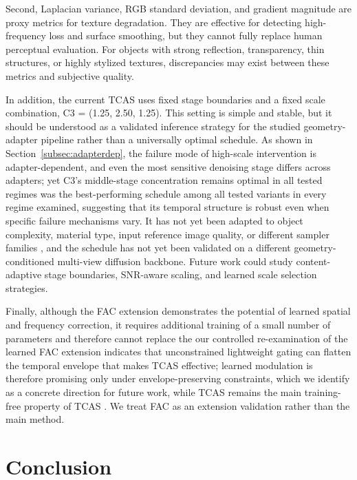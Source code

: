 \documentclass[times,twocolumn,final]{elsarticle}
\providecommand{\DIFadd}[1]{{\protect\color{blue} \sf #1}} %
\providecommand{\DIFdel}[1]{{\protect\color{red} \scriptsize #1}} %
\providecommand{\DIFaddbegin}{} %
\providecommand{\DIFaddend}{} %
\providecommand{\DIFdelbegin}{} %
\providecommand{\DIFdelend}{} %
\newcommand{\DIFscaledelfig}{0.5}
\newlength{\DIFdelgraphicswidth} %
\newlength{\DIFdelgraphicsheight} %
\newcommand{\DIFaddincludegraphics}[2][]{{\color{blue}\fbox{\DIFOincludegraphics[#1]{#2}}}} %
\newcommand{\DIFdelincludegraphics}[2][]{%
\sbox{\DIFdelgraphicsbox}{\DIFOincludegraphics[#1]{#2}}%
\settoboxwidth{\DIFdelgraphicswidth}{\DIFdelgraphicsbox} %
\settoboxtotalheight{\DIFdelgraphicsheight}{\DIFdelgraphicsbox} %
\scalebox{\DIFscaledelfig}{%
\parbox[b]{\DIFdelgraphicswidth}{\usebox{\DIFdelgraphicsbox}\\[-\baselineskip] \rule{\DIFdelgraphicswidth}{0em}}\llap{\resizebox{\DIFdelgraphicswidth}{\DIFdelgraphicsheight}{%
\setlength{\unitlength}{\DIFdelgraphicswidth}%
\begin{picture}(1,1)%
\thicklines\linethickness{2pt} %
{\color[rgb]{1,0,0}\put(0,0){\framebox(1,1){}}}%
{\color[rgb]{1,0,0}\put(0,0){\line( 1,1){1}}}%
{\color[rgb]{1,0,0}\put(0,1){\line(1,-1){1}}}%
\end{picture}%
}\hspace*{3pt}}} %
} %
\DeclareRobustCommand{\DIFaddbegin}{\DIFOaddbegin \let\includegraphics\DIFaddincludegraphics} %
\DeclareRobustCommand{\DIFaddend}{\DIFOaddend \let\includegraphics\DIFOincludegraphics} %
\DeclareRobustCommand{\DIFdelbegin}{\DIFOdelbegin \let\includegraphics\DIFdelincludegraphics} %
\DeclareRobustCommand{\DIFdelend}{\DIFOaddend \let\includegraphics\DIFOincludegraphics} %
\begin{document}
Second, Laplacian variance, RGB standard deviation, and gradient magnitude are proxy metrics for texture degradation. They are effective for detecting high-frequency loss and surface smoothing, but they cannot fully replace human perceptual evaluation. For objects with strong reflection, transparency, thin structures, or highly stylized textures, discrepancies may exist between these metrics and subjective quality.

In addition, the current TCAS uses fixed stage boundaries and a fixed scale combination, C3 = (1.25, 2.50, 1.25). This setting is simple and stable, but it should be understood as a validated inference strategy for the studied geometry-adapter pipeline rather than a universally optimal schedule. As shown in Section~\ref{subsec:adapterdep}, the failure mode of high-scale intervention is adapter-dependent, and even the most sensitive denoising stage differs across adapters; yet C3's middle-stage concentration \DIFdelbegin \DIFdel{remains optimal in all tested regimes}\DIFdelend \DIFaddbegin \DIFadd{was the best-performing schedule among all tested variants in every regime examined}\DIFaddend , suggesting that its temporal structure is robust even when specific failure mechanisms vary. It has not yet been adapted to object complexity, material type, input reference image quality, or different sampler families\DIFaddbegin \DIFadd{, and the schedule has not yet been validated on a different geometry-conditioned multi-view diffusion backbone}\DIFaddend . Future work could study content-adaptive stage boundaries, SNR-aware scaling, and learned scale selection strategies.

Finally, \DIFdelbegin \DIFdel{although the FAC extension demonstrates the potential of learned spatial and frequency correction, it requires additional training of a small number of parameters and therefore cannot replace the }\DIFdelend \DIFaddbegin \DIFadd{our controlled re-examination of the learned FAC extension indicates that unconstrained lightweight gating can flatten the temporal envelope that makes TCAS effective; learned modulation is therefore promising only under envelope-preserving constraints, which we identify as a concrete direction for future work, while TCAS remains the main }\DIFaddend training-free \DIFdelbegin \DIFdel{property of TCAS . We treat FAC as an extension validation rather than the main }\DIFdelend method.


\section{Conclusion}
\label{sec:conclusion}
\end{document}
